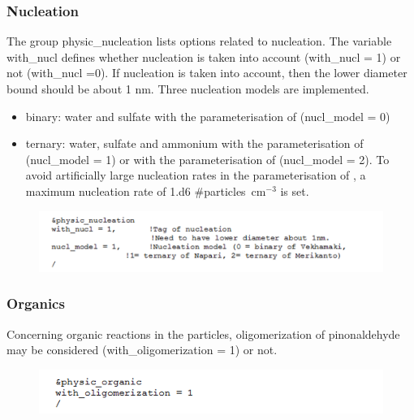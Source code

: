 \documentclass[a4paper,11pt]{article}
\begin{document}
\subsubsection{Nucleation}


The group physic\_nucleation lists options related to nucleation. The variable with\_nucl defines whether nucleation is taken into account (with\_nucl = 1) or not (with\_nucl =0). If nucleation is taken into account, then the lower diameter bound should be about 1 nm. Three nucleation models are implemented.
\begin{itemize}
\item binary: water and sulfate with the parameterisation of \cite{vehk} (nucl\_model = 0)
\item ternary: water, sulfate and ammonium with the parameterisation of \cite{napari} (nucl\_model = 1) or with the parameterisation of \cite{merikantoa, merikantob} (nucl\_model = 2).
To avoid artificially large nucleation rates in the parameterisation of \cite{napari}, a maximum nucleation rate of 1.d6 \#particles~cm$^{-3}$ is set.
\end{itemize}


\begin{figure}[H]
        \begin{center}
                \includegraphics[angle=0,width=\textwidth]{fig/nucleation.png}
        \end{center}
\end{figure}
          

\subsubsection{Organics}

Concerning organic reactions in the particles, oligomerization of pinonaldehyde may be considered (with\_oligomerization = 1) or not.

\begin{figure}[H]
        \begin{center}
                \includegraphics[angle=0,width=\textwidth]{fig/organic.png}
        \end{center}
\end{figure}
 
\end{document}

